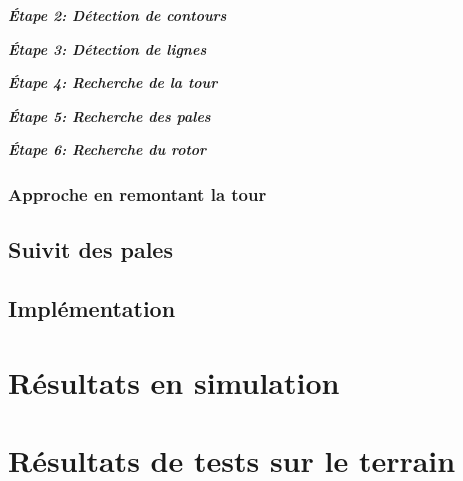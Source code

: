 \textbf{\textit{Étape 2: Détection de contours}}

\textbf{\textit{Étape 3: Détection de lignes}}

\textbf{\textit{Étape 4: Recherche de la tour}}

\textbf{\textit{Étape 5: Recherche des pales}}

\textbf{\textit{Étape 6: Recherche du rotor}}

\subsubsection{Approche en remontant la tour}


\subsection{Suivit des pales}


\subsection{Implémentation}


\section{Résultats en simulation}


\section{Résultats de tests sur le terrain}


\subsection{}
